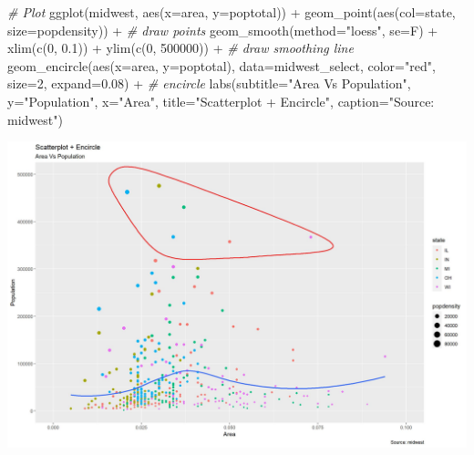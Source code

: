 \documentclass[
]{article}
\newenvironment{Shaded}{\begin{snugshade}}{\end{snugshade}}
\newcommand{\AttributeTok}[1]{\textcolor[rgb]{0.77,0.63,0.00}{#1}}
\newcommand{\CommentTok}[1]{\textcolor[rgb]{0.56,0.35,0.01}{\textit{#1}}}
\newcommand{\DecValTok}[1]{\textcolor[rgb]{0.00,0.00,0.81}{#1}}
\newcommand{\FloatTok}[1]{\textcolor[rgb]{0.00,0.00,0.81}{#1}}
\newcommand{\FunctionTok}[1]{\textcolor[rgb]{0.00,0.00,0.00}{#1}}
\newcommand{\NormalTok}[1]{#1}
\newcommand{\SpecialCharTok}[1]{\textcolor[rgb]{0.00,0.00,0.00}{#1}}
\newcommand{\StringTok}[1]{\textcolor[rgb]{0.31,0.60,0.02}{#1}}
\begin{document}
\begin{Shaded}
\begin{Highlighting}[]
\CommentTok{\# Plot}
\FunctionTok{ggplot}\NormalTok{(midwest, }\FunctionTok{aes}\NormalTok{(}\AttributeTok{x=}\NormalTok{area, }\AttributeTok{y=}\NormalTok{poptotal)) }\SpecialCharTok{+} 
  \FunctionTok{geom\_point}\NormalTok{(}\FunctionTok{aes}\NormalTok{(}\AttributeTok{col=}\NormalTok{state, }\AttributeTok{size=}\NormalTok{popdensity)) }\SpecialCharTok{+}   \CommentTok{\# draw points}
  \FunctionTok{geom\_smooth}\NormalTok{(}\AttributeTok{method=}\StringTok{"loess"}\NormalTok{, }\AttributeTok{se=}\NormalTok{F) }\SpecialCharTok{+} 
  \FunctionTok{xlim}\NormalTok{(}\FunctionTok{c}\NormalTok{(}\DecValTok{0}\NormalTok{, }\FloatTok{0.1}\NormalTok{)) }\SpecialCharTok{+} 
  \FunctionTok{ylim}\NormalTok{(}\FunctionTok{c}\NormalTok{(}\DecValTok{0}\NormalTok{, }\DecValTok{500000}\NormalTok{)) }\SpecialCharTok{+}   \CommentTok{\# draw smoothing line}
  \FunctionTok{geom\_encircle}\NormalTok{(}\FunctionTok{aes}\NormalTok{(}\AttributeTok{x=}\NormalTok{area, }\AttributeTok{y=}\NormalTok{poptotal), }
                \AttributeTok{data=}\NormalTok{midwest\_select, }
                \AttributeTok{color=}\StringTok{"red"}\NormalTok{, }
                \AttributeTok{size=}\DecValTok{2}\NormalTok{, }
                \AttributeTok{expand=}\FloatTok{0.08}\NormalTok{) }\SpecialCharTok{+}   \CommentTok{\# encircle}
  \FunctionTok{labs}\NormalTok{(}\AttributeTok{subtitle=}\StringTok{"Area Vs Population"}\NormalTok{, }
       \AttributeTok{y=}\StringTok{"Population"}\NormalTok{, }
       \AttributeTok{x=}\StringTok{"Area"}\NormalTok{, }
       \AttributeTok{title=}\StringTok{"Scatterplot + Encircle"}\NormalTok{, }
       \AttributeTok{caption=}\StringTok{"Source: midwest"}\NormalTok{)}
\end{Highlighting}
\end{Shaded}

\includegraphics{figures/unnamed-chunk-1-1.jpeg}
\end{document}
